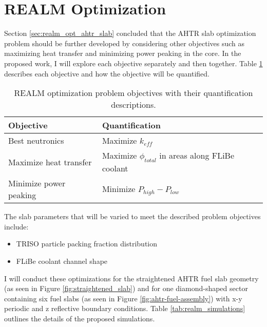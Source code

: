 \section{REALM Optimization}
Section \ref{sec:realm_opt_ahtr_slab} concluded that the \gls{AHTR} slab 
optimization problem should be further developed by considering other objectives 
such as maximizing heat transfer and minimizing power peaking in the core. 
In the proposed work, I will explore each objective separately and then together.
Table \ref{tab:objectives} describes each objective and how the objective will 
be quantified. 
\begin{table}[]
    \centering
    \onehalfspacing
    \caption{\acrfull{REALM} optimization problem objectives with their quantification 
    descriptions.}
	\label{tab:objectives}
    \footnotesize
    \begin{tabular}{p{4cm}p{8cm}}
    \hline 
    \textbf{Objective}& \textbf{Quantification}  \\
    \hline
    Best neutronics & Maximize $k_{eff}$\\ 
    Maximize heat transfer & Maximize $\phi_{total}$ in areas along FLiBe coolant \\
    Minimize power peaking & Minimize $P_{high}-P_{low}$ \\
    \hline
    \end{tabular}
\end{table}
The slab parameters that will be varied to meet the described problem objectives 
include: 
\begin{itemize}
    \item \gls{TRISO} particle packing fraction distribution
    \item \gls{FLiBe} coolant channel shape 
\end{itemize} 
I will conduct these optimizations for the straightened \gls{AHTR} fuel slab 
geometry (as seen in Figure \ref{fig:straightened_slab}) and for one 
diamond-shaped sector containing six fuel slabs (as seen in Figure 
\ref{fig:ahtr-fuel-assembly}) with x-y periodic and z reflective boundary 
conditions. 
Table \ref{tab:realm_simulations} outlines the details of the proposed 
simulations. 
